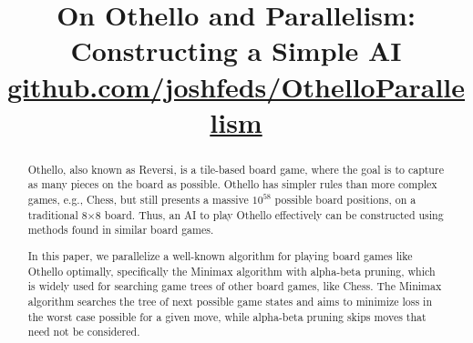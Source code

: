 \documentclass[conference]{IEEEtran}
\begin{document}
\title{\huge On Othello and Parallelism: Constructing a Simple AI\\
\href{https://github.com/joshfeds/OthelloParallelism}{\large{github.com/joshfeds/OthelloParallelism}}}

\author{
\and
{}
\and
{}
\and
{}
}

\maketitle

\begin{abstract}
Othello, also known as Reversi, is a tile-based board game, where the goal is to capture as many pieces on the board as possible. Othello has simpler rules than more complex games, e.g., Chess, but still presents a massive $10^{58}$ possible board positions, on a traditional 8$\times$8 board. Thus, an AI to play Othello effectively can be constructed using methods found in similar board games.

In this paper, we parallelize a well-known algorithm for playing board games like Othello optimally, specifically the Minimax algorithm with alpha-beta pruning, which is widely used for searching game trees of other board games, like Chess. The Minimax algorithm searches the tree of next possible game states and aims to minimize loss in the worst case possible for a given move, while alpha-beta pruning skips moves that need not be considered.

\end{abstract}
\end{document}
